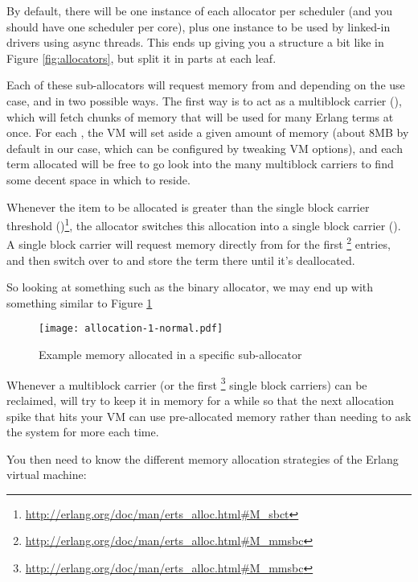 By default, there will be one instance of each allocator per scheduler (and you should have one scheduler per core), plus one instance to be used by linked-in drivers using async threads. This ends up giving you a structure a bit like in Figure \ref{fig:allocators}, but split it in  parts at each leaf.

Each of these sub-allocators will request memory from  and  depending on the use case, and in two possible ways. The first way is to act as a multiblock carrier (), which will fetch chunks of memory that will be used for many Erlang terms at once. For each , the VM will set aside a given amount of memory (about 8MB by default in our case, which can be configured by tweaking VM options), and each term allocated will be free to go look into the many multiblock carriers to find some decent space in which to reside.

Whenever the item to be allocated is greater than the single block carrier threshold ()\footnote{\href{http://erlang.org/doc/man/erts\_alloc.html\#M\_sbct}{http://erlang.org/doc/man/erts\_alloc.html\#M\_sbct}}, the allocator switches this allocation into a single block carrier (). A single block carrier will request memory directly from  for the first \footnote{\href{http://erlang.org/doc/man/erts\_alloc.html\#M\_mmsbc}{http://erlang.org/doc/man/erts\_alloc.html\#M\_mmsbc}} entries, and then switch over to  and store the term there until it's deallocated.

So looking at something such as the binary allocator, we may end up with something similar to Figure \ref{fig:allocation-1-normal}

\begin{figure}
  \texttt{[image: allocation-1-normal.pdf]}%
  \caption{Example memory allocated in a specific sub-allocator}%
   \label{fig:allocation-1-normal}
\end{figure}
\FloatBarrier

Whenever a multiblock carrier (or the first \footnote{\href{http://erlang.org/doc/man/erts\_alloc.html\#M\_mmsbc}{http://erlang.org/doc/man/erts\_alloc.html\#M\_mmsbc}} single block carriers) can be reclaimed,  will try to keep it in memory for a while so that the next allocation spike that hits your VM can use pre-allocated memory rather than needing to ask the system for more each time.

You then need to know the different memory allocation strategies of the Erlang virtual machine:


